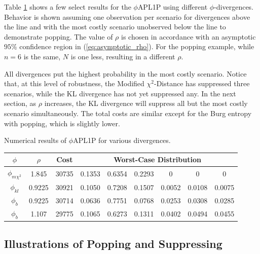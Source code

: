\documentclass[opre,nonblindrev]{informs3} %
\begin{document}
Table \ref{tb:numerical_results} shows a few select results for the $\phi$APL1P using different $\phi$-divergences.  
Behavior is shown assuming one observation per scenario for divergences above the line and with the most costly scenario unobserved below the line to demonstrate popping.
The value of $\rho$ is chosen in accordance with an asymptotic $95\%$ confidence region in (\ref{eq:asymptotic_rho}).
For the popping example, while $n=6$ is the same, $N$ is one less, resulting in a different $\rho$. 

All divergences put the highest probability in the most costly scenario. 
Notice that, at this level of robustness, the Modified $\chi^2$-Distance has suppressed three scenarios, while the KL divergence has not yet suppressed any.
In the next section, as $\rho$ increases, the KL divergence will suppress all but the most costly scenario simultaneously. 
The total costs are similar except for the Burg entropy with popping, which is slightly lower.


\begin{table}
	\TABLE
	{
		Numerical results of $\phi$APL1P for various divergences.
		\label{tb:numerical_results}
	}
	{\begin{tabular}{cc|c|cccccc}
		$\phi$ & $\rho$ & Cost & \multicolumn{6}{c}{Worst-Case Distribution} \\
		\hline
		$\phi_{m\chi^2}$ &  1.845  & 30735 & 0.1353 & 0.6354 & 0.2293 & 0      & 0      & 0 \\
		$\phi_{kl}$      &  0.9225 & 30921 & 0.1050 & 0.7208 & 0.1507 & 0.0052 & 0.0108 & 0.0075 \\
		$\phi_b$         &  0.9225 & 30714 & 0.0636 & 0.7751 & 0.0768 & 0.0253 & 0.0308 & 0.0285 \\
		\hline
		$\phi_b$         &  1.107  & 29775 & 0.1065 & 0.6273 & 0.1311 & 0.0402 & 0.0494 & 0.0455
	\end{tabular}}
	{}
\end{table}

\subsection{Illustrations of Popping and Suppressing}
\label{ssec:numerical_pop_suppress}


\end{document}

